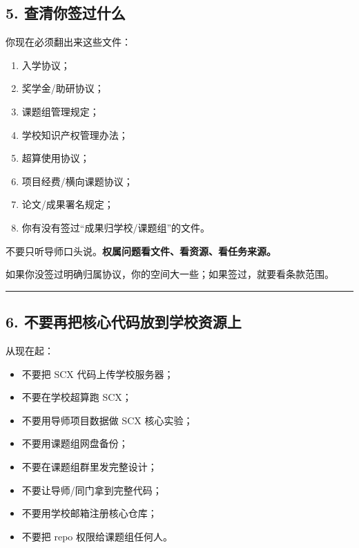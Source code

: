 \documentclass[
  12pt,
]{ctexart}
\providecommand{\tightlist}{%
  \setlength{\itemsep}{0pt}\setlength{\parskip}{0pt}}
\begin{document}
\subsection{5.
查清你签过什么}\label{ux67e5ux6e05ux4f60ux7b7eux8fc7ux4ec0ux4e48}

你现在必须翻出来这些文件：

\begin{enumerate}
\def\labelenumi{\arabic{enumi}.}
\tightlist
\item
  入学协议；
\item
  奖学金/助研协议；
\item
  课题组管理规定；
\item
  学校知识产权管理办法；
\item
  超算使用协议；
\item
  项目经费/横向课题协议；
\item
  论文/成果署名规定；
\item
  你有没有签过``成果归学校/课题组''的文件。
\end{enumerate}

不要只听导师口头说。\textbf{权属问题看文件、看资源、看任务来源。}

如果你没签过明确归属协议，你的空间大一些；如果签过，就要看条款范围。

\begin{center}\rule{0.5\linewidth}{0.5pt}\end{center}

\subsection{6.
不要再把核心代码放到学校资源上}\label{ux4e0dux8981ux518dux628aux6838ux5fc3ux4ee3ux7801ux653eux5230ux5b66ux6821ux8d44ux6e90ux4e0a}

从现在起：

\begin{itemize}
\tightlist
\item
  不要把 SCX 代码上传学校服务器；
\item
  不要在学校超算跑 SCX；
\item
  不要用导师项目数据做 SCX 核心实验；
\item
  不要用课题组网盘备份；
\item
  不要在课题组群里发完整设计；
\item
  不要让导师/同门拿到完整代码；
\item
  不要用学校邮箱注册核心仓库；
\item
  不要把 repo 权限给课题组任何人。
\end{itemize}
\end{document}
